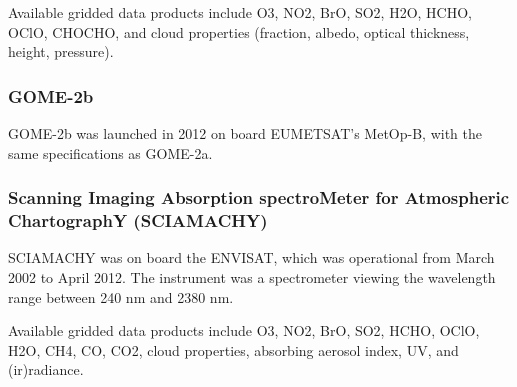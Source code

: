 Available gridded data products include O3, NO2, BrO, SO2, H2O, HCHO, OClO, CHOCHO, and cloud properties (fraction, albedo, optical thickness, height, pressure).

\subsubsection{GOME-2b}

GOME-2b was launched in 2012 on board EUMETSAT's MetOp-B, with the same specifications as GOME-2a.

\subsubsection{Scanning Imaging Absorption spectroMeter for Atmospheric ChartographY (SCIAMACHY)}

SCIAMACHY was on board the ENVISAT, which was operational from March 2002 to April 2012.
The instrument was a spectrometer viewing the wavelength range between 240 nm and 2380 nm. 

Available gridded data products include O3, NO2, BrO, SO2, HCHO, OClO, H2O, CH4, CO, CO2, cloud properties, absorbing aerosol index, UV, and (ir)radiance.


  
  